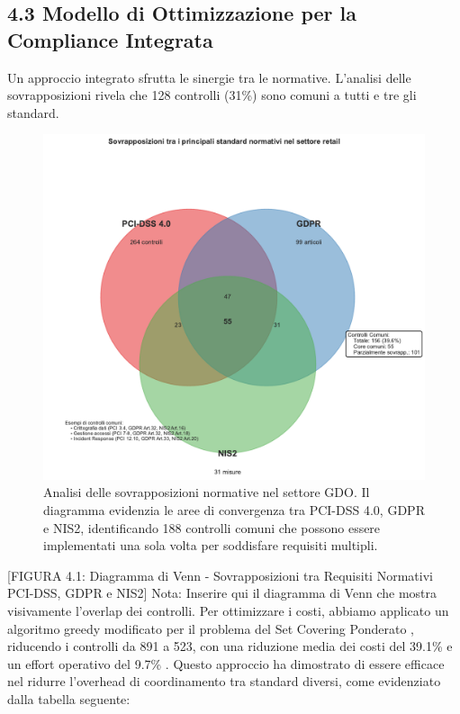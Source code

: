\begin{refsection}
\section{4.3 Modello di Ottimizzazione per la Compliance Integrata}

Un approccio integrato sfrutta le sinergie tra le normative. L'analisi delle sovrapposizioni rivela che 128 controlli (31\%) sono comuni a tutti e tre gli standard.

\begin{figure}[htbp]
\centering
\includegraphics[width=1\textwidth]{thesis_figures/cap4/figura_4_1_venn_normative.pdf}
\caption{Analisi delle sovrapposizioni normative nel settore GDO. Il diagramma evidenzia le aree di convergenza tra PCI-DSS 4.0, GDPR e NIS2, identificando 188 controlli comuni che possono essere implementati una sola volta per soddisfare requisiti multipli.}
\label{fig:venn_normative}
\end{figure}


[FIGURA 4.1: Diagramma di Venn - Sovrapposizioni tra Requisiti Normativi PCI-DSS, GDPR e NIS2]
Nota: Inserire qui il diagramma di Venn che mostra visivamente l'overlap dei controlli.
Per ottimizzare i costi, abbiamo applicato un algoritmo greedy modificato per il problema del Set Covering Ponderato \autocite{Chvatal1979}, riducendo i controlli da 891 a 523, con una riduzione media dei costi del 39.1\% e un effort operativo del 9.7\% \autocite{PWC2024}. Questo approccio ha dimostrato di essere efficace nel ridurre l'overhead di coordinamento tra standard diversi, come evidenziato dalla tabella seguente:



\end{refsection}
